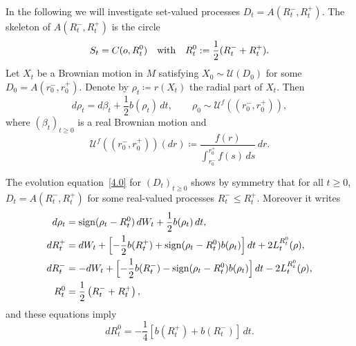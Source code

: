 \documentclass[10pt]{amsart}
\theoremstyle{plain}
\theoremstyle{definition}
\newcommand{\SU}{{\mathscr U}}
\newcommand\df{\coloneqq}
\newcommand{\sign}{\mathrm{sign}}
\let\f\frac
\let\b\beta
\begin{document}
In the following we will investigate set-valued processes $D_t=A(R_t^-, R_t^+)$.
The skeleton of $A(R_t^-,R_t^+)$ is the circle
\begin{equation}
S_t=C(o,R_t^0)\quad \hbox{with}\quad R_t^0:=\f12(R_t^-+R_t^+).
\end{equation}
Let $X_t$ be a Brownian motion in $M$ satisfying $X_0\sim \SU(D_0)$ for some $D_0=A(r_0^-,r_0^+)$. Denote by $\rho_t\df r(X_t)$ the radial part of $X_t$. Then
\begin{equation}
d\rho_t=d\b_t+\f12 b(\rho_t)\,dt, \qquad \rho_0\sim \SU^f((r_0^-,r_0^+)),
\end{equation}
where $(\b_t)_{t\ge0}$ is a real Brownian motion and
\begin{equation}
\SU^f((r_0^-,r_0^+))(dr)\df \f{f(r)}{\int_{r_0^-}^{r_0^+}f(s)\,ds}\,dr.
\end{equation}

The evolution equation~\eqref{4.0} for $(D_t)_{t\ge0}$ shows by symmetry that for all $t\ge 0$, $D_t=A(R_t^-,R_t^+)$ for some real-valued processes $R_t^-\le R_t^+$. Moreover it writes
\begin{equation}
\label{5.3.7}
\begin{split}
d\rho_t&=\sign(\rho_t-R_t^0)\,dW_t+\f12 b(\rho_t)\,dt,\\
dR_t^+&= dW_t+\Bigl[-\f12 b(R_t^+)+\sign(\rho_t-R_t^0)b(\rho_t)\Bigr]\,dt +2L_t^{R_t^0}(\rho),\\
dR_t^-&= -dW_t+\Bigl[-\f12 b(R_t^-)-\sign(\rho_t-R_t^0)b(\rho_t)\Bigr]\,dt -2L_t^{R_t^0}(\rho),\\
R_t^0&=\f12\left(R_t^-+R_t^+\right),
\end{split}
\end{equation}
and these equations imply
\begin{equation}
dR_t^0=-\f14\left[b(R_t^+)+b(R_t^-)\right]\,dt.
\end{equation}
\end{document}
